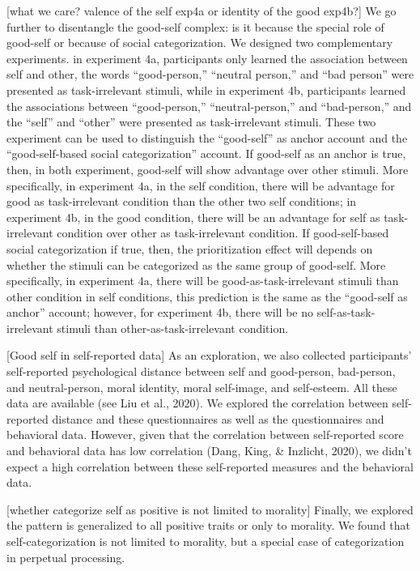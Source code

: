 \documentclass[
  english,
  man]{apa6}
\begin{document}
{[}what we care? valence of the self exp4a or identity of the good exp4b?{]} We go further to disentangle the good-self complex: is it because the special role of good-self or because of social categorization. We designed two complementary experiments. in experiment 4a, participants only learned the association between self and other, the words ``good-person,'' ``neutral person,'' and ``bad person'' were presented as task-irrelevant stimuli, while in experiment 4b, participants learned the associations between ``good-person,'' ``neutral-person,'' and ``bad-person,'' and the ``self'' and ``other'' were presented as task-irrelevant stimuli. These two experiment can be used to distinguish the ``good-self'' as anchor account and the ``good-self-based social categorization'' account. If good-self as an anchor is true, then, in both experiment, good-self will show advantage over other stimuli. More specifically, in experiment 4a, in the self condition, there will be advantage for good as task-irrelevant condition than the other two self conditions; in experiment 4b, in the good condition, there will be an advantage for self as task-irrelevant condition over other as task-irrelevant condition. If good-self-based social categorization if true, then, the prioritization effect will depends on whether the stimuli can be categorized as the same group of good-self. More specifically, in experiment 4a, there will be good-as-task-irrelevant stimuli than other condition in self conditions, this prediction is the same as the ``good-self as anchor'' account; however, for experiment 4b, there will be no self-as-task-irrelevant stimuli than other-as-task-irrelevant condition.

{[}Good self in self-reported data{]} As an exploration, we also collected participants' self-reported psychological distance between self and good-person, bad-person, and neutral-person, moral identity, moral self-image, and self-esteem. All these data are available (see Liu et al., 2020). We explored the correlation between self-reported distance and these questionnaires as well as the questionnaires and behavioral data. However, given that the correlation between self-reported score and behavioral data has low correlation (Dang, King, \& Inzlicht, 2020), we didn't expect a high correlation between these self-reported measures and the behavioral data.

{[}whether categorize self as positive is not limited to morality{]} Finally, we explored the pattern is generalized to all positive traits or only to morality. We found that self-categorization is not limited to morality, but a special case of categorization in perpetual processing.
\end{document}
